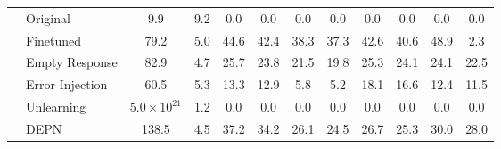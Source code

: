 \begin{table}[t]
{\begin{tabular}{ll|cc|cccccccc}
\multicolumn{1}{l|}{}                                                   & Original                                                   & 9.9                                   & 9.2                                                         & 0.0               & 0.0               & 0.0               & 0.0               & 0.0               & 0.0                & 0.0                 & 0.0                 \\
\multicolumn{1}{l|}{}                                                   & Finetuned                                                  & 79.2                                  & 5.0                                                         & 44.6              & 42.4              & 38.3              & 37.3              & 42.6              & 40.6               & 48.9                & 2.3                 \\ \cline{2-12} 
\multicolumn{1}{l|}{}                                                   & Empty Response                                             & 82.9                                  & 4.7                                                         & 25.7              & 23.8              & 21.5              & 19.8              & 25.3              & 24.1               & 24.1                & 22.5                \\
\multicolumn{1}{l|}{}                                                   & Error Injection                                            & 60.5                                  & 5.3                                                         & 13.3              & 12.9              & 5.8               & 5.2               & 18.1              & 16.6               & 12.4                & 11.5                \\
\multicolumn{1}{l|}{}                                                   & Unlearning                                                 & $5.0\times10^{21}$                    & 1.2                                                         & 0.0               & 0.0               & 0.0               & 0.0               & 0.0               & 0.0                & 0.0                 & 0.0                 \\
\multicolumn{1}{l|}{}                                                   & DEPN                                                       & 138.5                                 & 4.5                                                         & 37.2              & 34.2              & 26.1              & 24.5              & 26.7              & 25.3               & 30.0                & 28.0                \\

\end{tabular}}
\end{table}
